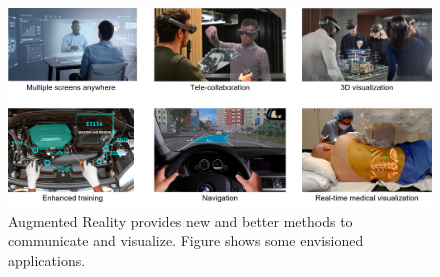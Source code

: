 \begin{figure}[h!]
\centering
\includegraphics[width=\columnwidth]{images/other/motivation}
\caption[Motivation for Augmented Reality]{Augmented Reality provides new and better methods to communicate and visualize. Figure shows some envisioned applications. }
\label{fig:motivation}
\end{figure}

